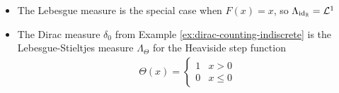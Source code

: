 \begin{ex}[]
\phantom{a}
\begin{itemize}
  \item The Lebesgue measure is the special case when $F(x) = x$, so $\Lambda_{\operatorname{id}_{\mathbb{R}}} = \mathcal{L}^{1}$
  \item The Dirac measure $\delta_0$ from Example \ref{ex:dirac-counting-indiscrete} is the Lebesgue-Stieltjes measure $\Lambda_{\Theta}$ for the Heaviside step function
    \begin{align*}
      \Theta(x) = \left\{\begin{array}{ll}
        1 & x > 0\\
        0 & x \leq 0
      \end{array} \right.
    \end{align*}
\end{itemize}
\end{ex}
